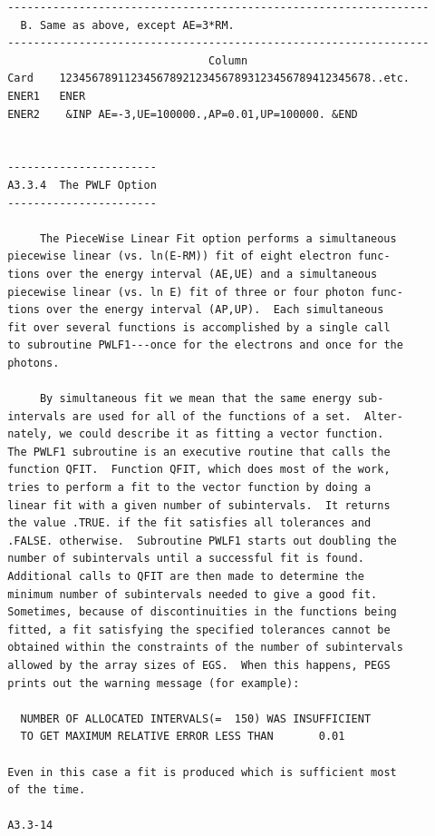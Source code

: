 \newpage {} \begin{verbatim}
 -----------------------------------------------------------------
   B. Same as above, except AE=3*RM.
 -----------------------------------------------------------------
                                Column
 Card    123456789112345678921234567893123456789412345678..etc.
 ENER1   ENER
 ENER2    &INP AE=-3,UE=100000.,AP=0.01,UP=100000. &END
 
 
 -----------------------
 A3.3.4  The PWLF Option
 -----------------------
 
      The PieceWise Linear Fit option performs a simultaneous
 piecewise linear (vs. ln(E-RM)) fit of eight electron func-
 tions over the energy interval (AE,UE) and a simultaneous
 piecewise linear (vs. ln E) fit of three or four photon func-
 tions over the energy interval (AP,UP).  Each simultaneous
 fit over several functions is accomplished by a single call
 to subroutine PWLF1---once for the electrons and once for the
 photons.
 
      By simultaneous fit we mean that the same energy sub-
 intervals are used for all of the functions of a set.  Alter-
 nately, we could describe it as fitting a vector function.
 The PWLF1 subroutine is an executive routine that calls the
 function QFIT.  Function QFIT, which does most of the work,
 tries to perform a fit to the vector function by doing a
 linear fit with a given number of subintervals.  It returns
 the value .TRUE. if the fit satisfies all tolerances and
 .FALSE. otherwise.  Subroutine PWLF1 starts out doubling the
 number of subintervals until a successful fit is found.
 Additional calls to QFIT are then made to determine the
 minimum number of subintervals needed to give a good fit.
 Sometimes, because of discontinuities in the functions being
 fitted, a fit satisfying the specified tolerances cannot be
 obtained within the constraints of the number of subintervals
 allowed by the array sizes of EGS.  When this happens, PEGS
 prints out the warning message (for example):
 
   NUMBER OF ALLOCATED INTERVALS(=  150) WAS INSUFFICIENT
   TO GET MAXIMUM RELATIVE ERROR LESS THAN       0.01
 
 Even in this case a fit is produced which is sufficient most
 of the time.
 
 A3.3-14
\end{verbatim} 
